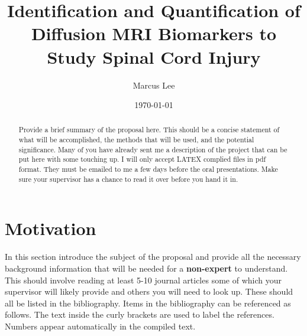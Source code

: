 \documentclass[draft, twocolumn,showpacs,preprintnumbers,amsmath,amssymb]{revtex4}
\begin{document}
\title{Identification and Quantification of Diffusion MRI Biomarkers to Study Spinal Cord Injury}

\author{Marcus Lee}

\date{\today}

\begin{abstract}
Provide a brief summary of the proposal here. This  should be a concise  
statement of what will be accomplished, the methods that will be used, and the potential significance. Many of you have already sent me a description of the project that can be put here with some  touching up. I will only  accept LATEX complied files in pdf format. They must be emailed to me a few days  before the oral presentations.  Make sure your supervisor has a chance to read it over before you hand it in. 

\end{abstract}

\maketitle


\section{Motivation}


In this section introduce the subject of the proposal and  provide all the necessary background information that will be needed for a {\bf non-expert} to understand.  This  should involve reading at least 5-10 journal articles some of which your supervisor will likely provide and others you will need to look up. These should all be listed in the bibliography. 
Items in the bibliography can be referenced  as follows. The text inside the curly brackets are
used to label the references. Numbers appear automatically in the compiled
text.
\end{document}
